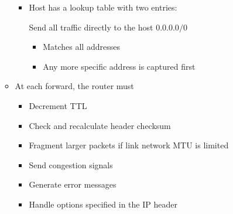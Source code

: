 \begin{itemize}
\begin{itemize}
                \begin{itemize}
                    \item Host has a lookup table with two entries:
                        \begin{itemize}
                             Send all traffic directly to the host
                             $0.0.0.0/0$
                                \begin{itemize}
                                    \item Matches all addresses
                                    \item Any more specific address is captured first
                                \end{itemize}
                        \end{itemize}
                \end{itemize}
            \item At each forward, the router must
                \begin{itemize}
                    \item Decrement TTL
                    \item Check and recalculate header checksum
                    \item Fragment larger packets if link network MTU is limited
                    \item Send congestion signals
                    \item Generate error messages
                    \item Handle options specified in the IP header
                \end{itemize}
        \end{itemize}
\end{itemize}

